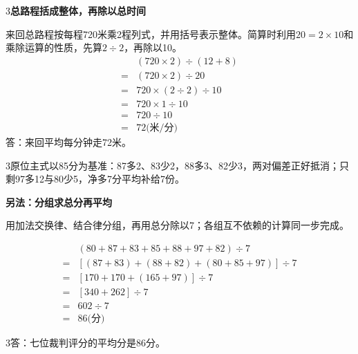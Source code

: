 \documentclass[multi=snippet,border={5bp 20bp 5bp 5bp}]{standalone}
\newenvironment{snippet}[3]{\begin{minipage}{#1bp}\color{answerred}\fontsize{#2}{#3}\selectfont\raggedright}{\end{minipage}}
\begin{document}
\begin{snippet}{505}{11.5}{14}\begin{multicols}{3}\raggedcolumns \textbf{总路程括成整体，再除以总时间}\par 来回总路程按每程720米乘2程列式，并用括号表示整体。简算时利用\(20=2\times10\)\allowbreak 和乘除运算的性质，先算\(2\div2\)\allowbreak ，再除以10。\[\begin{aligned}&(720\times2)\div(12+8)\\={}&(720\times2)\div20\\={}&720\times(2\div2)\div10\\={}&720\times1\div10\\={}&720\div10\\={}&72\text{(米/分)}\end{aligned}\]答：来回平均每分钟走72米。\end{multicols}\end{snippet}
\begin{snippet}{505}{11.5}{14}\begin{multicols}{3}\raggedcolumns 原位主式以85分为基准：87多2、83少2，88多3、82少3，两对偏差正好抵消；只剩97多12与80少5，净多7分平均补给7份。\par\textbf{另法：分组求总分再平均}\par 用加法交换律、结合律分组，再用总分除以7；各组互不依赖的计算同一步完成。\end{multicols}\[\begin{aligned}&(80+87+83+85+88+97+82)\div7\\={}&[(87+83)+(88+82)+(80+85+97)]\div7\\={}&[170+170+(165+97)]\div7\\={}&[340+262]\div7\\={}&602\div7\\={}&86\text{(分)}\end{aligned}\]\begin{multicols}{3}\raggedcolumns 答：七位裁判评分的平均分是86分。\end{multicols}\end{snippet}
\end{document}
